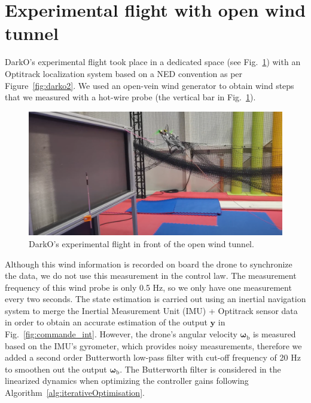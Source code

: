 \section{Experimental flight with open wind tunnel} 
\label{sec:exp}
DarkO's experimental flight took place in a dedicated space (see Fig.~\ref{fig:flight_windshape}) with an Optitrack localization system based on a NED convention as per Figure~\ref{fig:darko2}. We used an open-vein wind generator to obtain wind steps that we measured with a hot-wire probe (the vertical bar in Fig.~\ref{fig:flight_windshape}). 
\begin{figure}[ht]
    \centering
    \includegraphics[trim=0cm 0cm 0cm 0cm,clip,width=1\columnwidth]{figures/img_flight_darko.png}
    \caption{DarkO's experimental flight in front of the open wind tunnel.}
    \label{fig:flight_windshape}
\end{figure}
Although this wind information is recorded on board the drone to synchronize the data, we do not use this measurement in the control law. The measurement frequency of this wind probe is only 0.5 Hz, so we only have one measurement every two seconds. 
The state estimation is carried out using an inertial navigation system to merge the Inertial Measurement Unit (IMU) + Optitrack sensor data in order to obtain an accurate estimation of the output $\boldsymbol{y}$ in Fig.~\ref{fig:commande_int}. However, the drone's angular velocity $\boldsymbol{\omega}_{\text{b}}$ is measured based on the IMU's gyrometer, which provides noisy measurements, therefore we added a second order Butterworth low-pass filter with cut-off frequency of 20 Hz to smoothen out the output $\boldsymbol{\omega}_{\text{b}}$. The Butterworth filter is considered in the linearized dynamics when optimizing the controller gains following Algorithm~\ref{alg:iterativeOptimisation}. 
